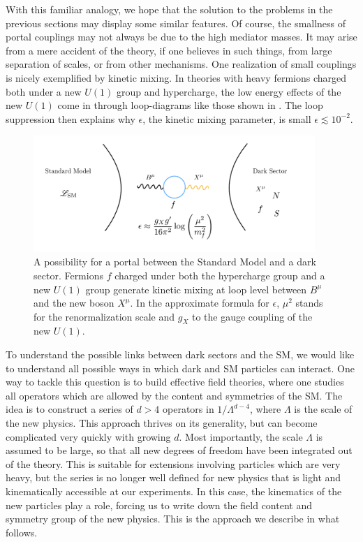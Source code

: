 With this familiar analogy, we hope that the solution to the problems in the previous sections may display some similar features. Of course, the smallness of portal couplings may not always be due to the high mediator masses. It may arise from a mere accident of the theory, if one believes in such things, from large separation of scales, or from other mechanisms. One realization of small couplings is nicely exemplified by kinetic mixing. In theories with heavy fermions charged both under a new $U(1)$ group and hypercharge, the low energy effects of the new $U(1)$ come in through loop-diagrams like those shown in . The loop suppression then explains why $\epsilon$, the kinetic mixing parameter, is small $\epsilon \lesssim 10^{-2}$.
%
\begin{figure}[t]
 \includegraphics[width=0.95\textwidth]{Dark_sectors.pdf}
 \caption[A possibility for a portal coupling and why it is small.]{A possibility for a portal between the Standard Model and a dark sector. Fermions $f$ charged under both the hypercharge group and a new $U(1)$ group generate kinetic mixing at loop level between $B^\mu$ and the new boson $X^\mu$. In the approximate formula for $\epsilon$, $\mu^2$ stands for the renormalization scale and $g_X$ to the gauge coupling of the new $U(1)$. \label{fig:portals_diagram}}
\end{figure}
%

To understand the possible links between dark sectors and the SM, we would like to understand all possible ways in which dark and SM particles can interact. One way to tackle this question is to build effective field theories, where one studies all operators which are allowed by the content and symmetries of the SM. The idea is to construct a series of $d>4$ operators in $1/\Lambda^{d-4}$, where $\Lambda$ is the scale of the new physics. This approach thrives on its generality, but can become complicated very quickly with growing $d$. Most importantly, the scale $\Lambda$ is assumed to be large, so that all new degrees of freedom have been integrated out of the theory. This is suitable for extensions involving particles which are very heavy, but the series is no longer well defined for new physics that is light and kinematically accessible at our experiments. In this case, the kinematics of the new particles play a role, forcing us to write down the field content and symmetry group of the new physics. This is the approach we describe in what follows.

